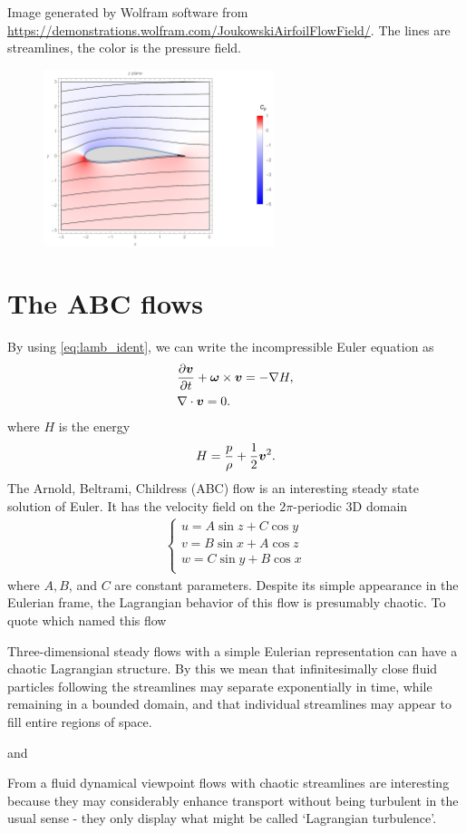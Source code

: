 \documentclass[11pt,letterpaper]{report}
\begin{document}
Image generated by Wolfram software from \url{https://demonstrations.wolfram.com/JoukowskiAirfoilFlowField/}. The lines are streamlines, the color is the pressure field.
\begin{figure}[H]
    \centering
    \includegraphics[width=0.6\textwidth]{Session_4/figs/Airfoil}
\end{figure}

\section{The ABC flows}
By using \eqref{eq:lamb_ident}, we can write the incompressible Euler equation as
\begin{align}
    &\frac{\partial\boldsymbol{v}}{\partial t}+\boldsymbol{\omega}\times\boldsymbol{v} = -\nabla H,\\
    &\nabla\cdot\boldsymbol{v} = 0.
\end{align}
where $H$ is the energy
\begin{align}
    H = \frac{p}{\rho}+\frac{1}{2}\boldsymbol{v}^2.
\end{align}
The Arnold, Beltrami, Childress (ABC) flow is an interesting steady state solution of Euler. It has the velocity field on the $2\pi$-periodic 3D domain
\begin{align}
    \begin{cases}
        u= A\sin z+C\cos y\\
        v= B\sin x+A\cos z\\
        w= C\sin y+B\cos x\\
    \end{cases}
\end{align}
where $A,B$, and $C$ are constant parameters. Despite its simple appearance in the Eulerian frame, the Lagrangian behavior of this flow is presumably chaotic. To quote \cite{DombreEtAl_86} which named this flow
\begin{displayquote}
Three-dimensional steady flows with a simple Eulerian representation can have a chaotic Lagrangian structure. By this we mean that infinitesimally close fluid particles following the streamlines may separate exponentially in time, while remaining in a bounded domain, and that individual streamlines may appear to fill entire regions of space.
\end{displayquote}
and
\begin{displayquote}
    From a fluid dynamical viewpoint flows with chaotic streamlines are interesting because they may considerably enhance transport without being turbulent in the usual sense - they only display what might be called `Lagrangian turbulence'.
\end{displayquote}
\end{document}
